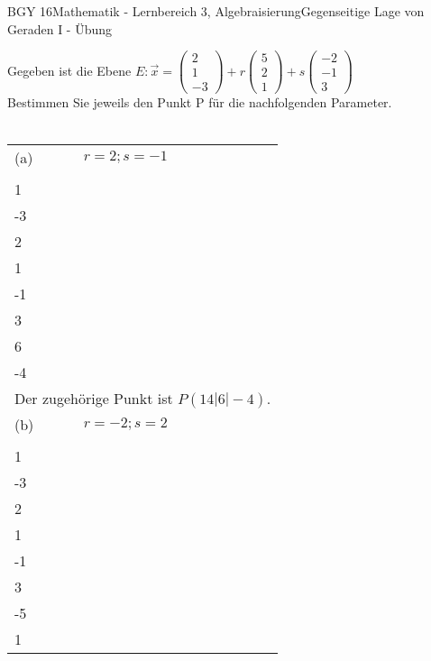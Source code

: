 \documentclass[oneside,openany,headings=optiontotoc,11pt,numbers=noenddot]{scrreprt}
\begin{document}
	\begin{worksheet}{BGY 16}{Mathematik - Lernbereich 3, Algebraisierung}{Gegenseitige Lage von Geraden I - Übung}
				
		\begin{framed}
			\noindent
			Gegeben ist die Ebene \(E: \vec{x} = \left(\begin{array}{c}2\\1\\-3\end{array}\right) + r\left(\begin{array}{c}5\\2\\1\end{array}\right) +s\left(\begin{array}{c}-2\\-1\\3\end{array}\right)\)\\
			Bestimmen Sie jeweils den Punkt P für die nachfolgenden Parameter.\\
			\hdashrule[0.5ex][x]{\textwidth}{0.1mm}{8mm 2pt}\\
			\begin{tabularx}{\textwidth}{lX}
				(a) & \(r=2; s= -1\)\\
				& \(\vec{x} = \left(\begin{array}{c}2\\1\\-3\end{array}\right) + 2*\left(\begin{array}{c}5\\2\\1\end{array}\right) -\left(\begin{array}{c}-2\\-1\\3\end{array}\right) = \left(\begin{array}{c}14\\6\\-4\end{array}\right)\)\\
				\multicolumn{2}{l}{Der zugehörige Punkt ist \(P(14|6|-4)\).}\\
				(b)& \(r=-2; s=2\)\\
				& \(\vec{x} = \left(\begin{array}{c}2\\1\\-3\end{array}\right) - 2*\left(\begin{array}{c}5\\2\\1\end{array}\right) +2\left(\begin{array}{c}-2\\-1\\3\end{array}\right) = \left(\begin{array}{c}-12\\-5\\1\end{array}\right)\)\\

\end{tabularx}
\end{framed}
\end{worksheet}
\end{document}
